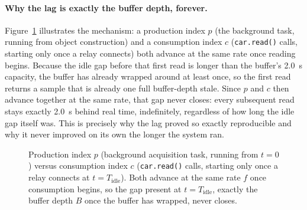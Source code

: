 \paragraph{Why the lag is exactly the buffer depth, forever.}
Figure~\ref{fig:ringbuffer-lag} illustrates the mechanism: a
production index $p$ (the background task, running from object
construction) and a consumption index $c$ (\texttt{car.read()}
calls, starting only once a relay connects) both advance at the same
rate once reading begins. Because the idle gap before that first
read is longer than the buffer's \SI{2.0}{\second} capacity, the
buffer has already wrapped around at least once, so the first read
returns a sample that is already one full buffer-depth stale. Since
$p$ and $c$ then advance together at the same rate, that gap never
closes: every subsequent read stays exactly \SI{2.0}{\second} behind
real time, indefinitely, regardless of how long the idle gap itself
was. This is precisely why the lag proved so exactly reproducible
and why it never improved on its own the longer the system ran.

\begin{figure}[htbp]
  \centering
  \caption[Ring-buffer production/consumption lag over time]{Production index $p$ (background acquisition task, running
    from $t=0$) versus consumption index $c$ (\texttt{car.read()}
    calls, starting only once a relay connects at $t=T_{\text{idle}}$).
    Both advance at the same rate $f$ once consumption begins, so the
    gap present at $t=T_{\text{idle}}$, exactly the buffer depth $B$
    once the buffer has wrapped, never closes.}
  \label{fig:ringbuffer-lag}
\end{figure}


